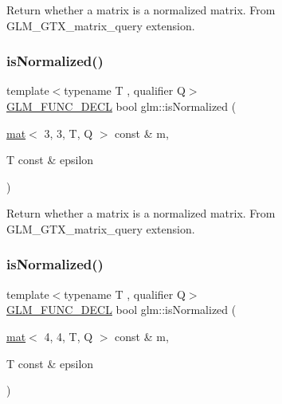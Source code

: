 Return whether a matrix is a normalized matrix. From G\+L\+M\+\_\+\+G\+T\+X\+\_\+matrix\+\_\+query extension. \mbox{\label{group__gtx__matrix__query_gaa068311695f28f5f555f5f746a6a66fb}} 
\subsubsection{\texorpdfstring{is\+Normalized()}{isNormalized()}\hspace{0.1cm}{\footnotesize\ttfamily [2/3]}}
{\footnotesize\ttfamily template$<$typename T , qualifier Q$>$ \\
\hyperlink{setup_8hpp_ab2d052de21a70539923e9bcbf6e83a51}{G\+L\+M\+\_\+\+F\+U\+N\+C\+\_\+\+D\+E\+CL} bool glm\+::is\+Normalized (\begin{DoxyParamCaption}\item[{\hyperlink{structglm_1_1mat}{mat}$<$ 3, 3, T, Q $>$ const \&}]{m,  }\item[{T const \&}]{epsilon }\end{DoxyParamCaption})}

Return whether a matrix is a normalized matrix. From G\+L\+M\+\_\+\+G\+T\+X\+\_\+matrix\+\_\+query extension. \mbox{\label{group__gtx__matrix__query_ga4d9bb4d0465df49fedfad79adc6ce4ad}} 
\subsubsection{\texorpdfstring{is\+Normalized()}{isNormalized()}\hspace{0.1cm}{\footnotesize\ttfamily [3/3]}}
{\footnotesize\ttfamily template$<$typename T , qualifier Q$>$ \\
\hyperlink{setup_8hpp_ab2d052de21a70539923e9bcbf6e83a51}{G\+L\+M\+\_\+\+F\+U\+N\+C\+\_\+\+D\+E\+CL} bool glm\+::is\+Normalized (\begin{DoxyParamCaption}\item[{\hyperlink{structglm_1_1mat}{mat}$<$ 4, 4, T, Q $>$ const \&}]{m,  }\item[{T const \&}]{epsilon }\end{DoxyParamCaption})}

